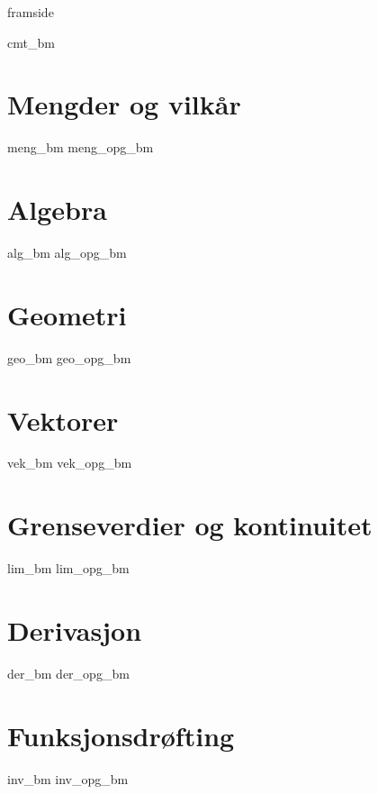 




\addto\captionsenglish{\renewcommand{\figurename}{Figur}}
\makeatletter
\addto\captionsenglish{\renewcommand{\chaptername}{Kapittel}}
\addto\captionsenglish{\renewcommand{\contentsname}{Innhold}}


	
	{framside}
	
	{\footnotesize \tableofcontents}
	\newpage
	
	{cmt_bm}
	
	\chapter{Mengder og vilkår} \label{Meng}
	\newpage
	{meng_bm}
	{meng_opg_bm}
	
	\chapter{Algebra} \label{Alg}
	\newpage
	{alg_bm} 
	{alg_opg_bm}
	
	\chapter{Geometri} \label{Geo}
	\newpage
	{geo_bm}
	{geo_opg_bm}	
	
	\chapter{Vektorer} \label{Vek}
	\newpage
	{vek_bm}
	{vek_opg_bm}	
		
	\chapter{Grenseverdier og kontinuitet} \label{Lim}
	\newpage
	{lim_bm}	
	{lim_opg_bm}
	
	\chapter{Derivasjon} \label{Derivasjon} \label{Der}
	\newpage
	{der_bm}
	{der_opg_bm}	
	
	\chapter{Funksjonsdrøfting} \label{Funk}
	\newpage
	{inv_bm}
	{inv_opg_bm}
	
